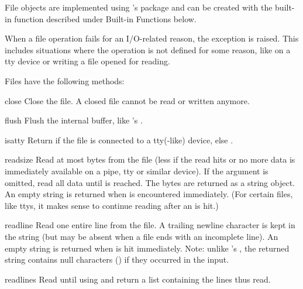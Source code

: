 File objects are implemented using \C{}'s  package and can be
created with the built-in function  described under
Built-in Functions below.

When a file operation fails for an I/O-related reason, the exception
 is raised.  This includes situations where the
operation is not defined for some reason, like  on a tty
device or writing a file opened for reading.

Files have the following methods:


\renewcommand{\indexsubitem}{(file method)}

\begin{funcdesc}{close}{}
  Close the file.  A closed file cannot be read or written anymore.
\end{funcdesc}

\begin{funcdesc}{flush}{}
  Flush the internal buffer, like 's .
\end{funcdesc}

\begin{funcdesc}{isatty}{}
  Return  if the file is connected to a tty(-like) device, else
  .
\end{funcdesc}

\begin{funcdesc}{read}{size}
  Read at most  bytes from the file (less if the read hits
  \EOF{} or no more data is immediately available on a pipe, tty or
  similar device).  If the  argument is omitted, read all
  data until \EOF{} is reached.  The bytes are returned as a string
  object.  An empty string is returned when \EOF{} is encountered
  immediately.  (For certain files, like ttys, it makes sense to
  continue reading after an \EOF{} is hit.)
\end{funcdesc}

\begin{funcdesc}{readline}{}
  Read one entire line from the file.  A trailing newline character is
  kept in the string (but may be absent when a file ends with an
  incomplete line).  An empty string is returned when \EOF{} is hit
  immediately.  Note: unlike 's , the returned
  string contains null characters () if they occurred in the
  input.
\end{funcdesc}

\begin{funcdesc}{readlines}{}
  Read until \EOF{} using  and return a list containing
  the lines thus read.
\end{funcdesc}


